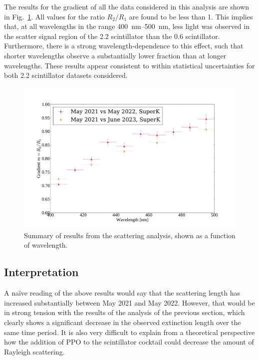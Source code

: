 The results for the gradient of all the data considered in this analysis are shown in Fig.~\ref{fig:smellie_scat_results_vs_wavelength}. All values for the ratio $R_{2}/R_{1}$ are found to be less than 1. This implies that, at all wavelengths in the range \SIrange{400}{500}{\nm}, less light was observed in the scatter signal region of the \SI{2.2}{\gpl} scintillator than the \SI{0.6}{\gpl} scintillator. Furthermore, there is a strong wavelength-dependence to this effect, such that shorter wavelengths observe a substantially lower fraction than at longer wavelengths. These results appear consistent to within statistical uncertainties for both \SI{2.2}{\gpl} scintillator datasets considered.

\begin{figure}
    \centering
    \includegraphics[width=\textwidth]{5_SMELLIEAnalysis/images/scattering_results_summary.pdf}
    \caption[Summary of results from the scattering analysis]
    {Summary of results from the scattering analysis, shown as a function of wavelength.}
    \label{fig:smellie_scat_results_vs_wavelength}
\end{figure}

\subsection{Interpretation}\label{sec:smellie_scat_discussion}
A na\"{i}ve reading of the above results would say that the scattering length has increased substantially between May 2021 and May 2022. However, that would be in strong tension with the results of the analysis of the previous section, which clearly shows a significant decrease in the observed extinction length over the same time period. It is also very difficult to explain from a theoretical perspective how the addition of PPO to the scintillator cocktail could decrease the amount of Rayleigh scattering.

